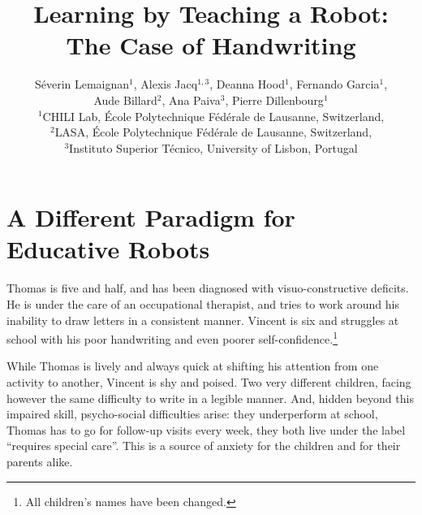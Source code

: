 \documentclass{article}
\title{Learning by Teaching a Robot:\\The Case of Handwriting}
\author{Séverin Lemaignan$^1$, Alexis Jacq$^{1,3}$, Deanna Hood$^1$, Fernando Garcia$^1$, \\
    Aude Billard$^2$, Ana Paiva$^3$, Pierre Dillenbourg$^1$ \\
$^1$CHILI Lab, École Polytechnique Fédérale de Lausanne, Switzerland,\\
$^2$LASA, École Polytechnique Fédérale de Lausanne, Switzerland,\\
$^3$Instituto Superior Técnico, University of Lisbon, Portugal}
\begin{document}
\maketitle

%
%


\section{A Different Paradigm for Educative Robots}

Thomas is five and half, and has been diagnosed with visuo-constructive
deficits. He is under the care of an occupational therapist, and tries to
work around his inability to draw letters in a consistent manner. Vincent is six
and struggles at school with his poor handwriting and even poorer
self-confidence.\footnote{All children's names have been changed.}

While Thomas is lively and always quick at shifting his attention from one
activity to another, Vincent is shy and poised. Two very different children,
facing however the same difficulty to write in a legible manner. And, hidden
beyond this impaired skill, psycho-social difficulties arise: they underperform
at school, Thomas has to go for follow-up visits every week, they both live
under the label ``requires special care''. This is a source of anxiety for the
children and for their parents alike.
\end{document}
